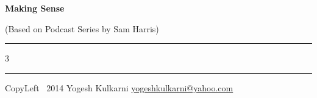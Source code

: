 \documentclass[8pt,landscape]{article}
\begin{document}
\begin{center}
     \Large{\textbf{Making Sense}}  %
		 
		 {\tiny (Based on Podcast Series by Sam Harris)}
\end{center}
\rule{\linewidth}{0.25pt}
\raggedright
\footnotesize
\begin{multicols}{3}




\rule{0.3\linewidth}{0.25pt}

\scriptsize
CopyLeft \textcopyleft\ 2014 Yogesh Kulkarni
\href{http://www.yogeshkulkarni.com}{yogeshkulkarni@yahoo.com}

\end{multicols}
\end{document}
